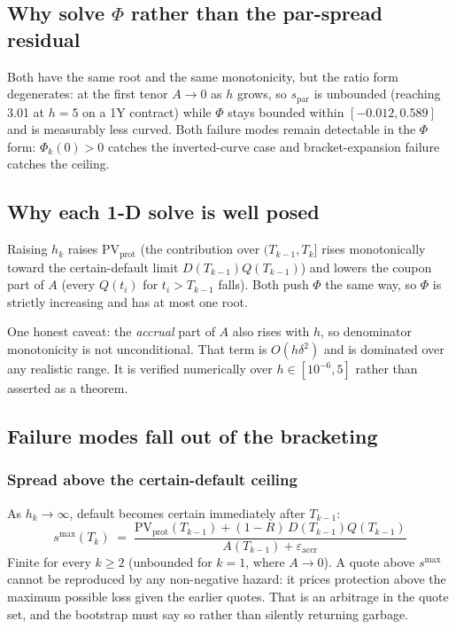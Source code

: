 \documentclass[11pt,a4paper]{article}
\begin{document}
\subsection{Why solve $\Phi$ rather than the par-spread residual}

Both have the same root and the same monotonicity, but the ratio form degenerates: at the
first tenor $A \to 0$ as $h$ grows, so $s_{\text{par}}$ is unbounded (reaching 3.01 at $h=5$
on a 1Y contract) while $\Phi$ stays bounded within $[-0.012, 0.589]$ and is measurably less
curved. Both failure modes remain detectable in the $\Phi$ form: $\Phi_k(0) > 0$ catches the
inverted-curve case and bracket-expansion failure catches the ceiling.

\subsection{Why each 1-D solve is well posed}

Raising $h_k$ raises $\text{PV}_{\text{prot}}$ (the contribution over $(T_{k-1},T_k]$ rises
monotonically toward the certain-default limit $D(T_{k-1})Q(T_{k-1})$) and lowers the coupon
part of $A$ (every $Q(t_i)$ for $t_i > T_{k-1}$ falls). Both push $\Phi$ the same way, so
$\Phi$ is strictly increasing and has at most one root.

One honest caveat: the \emph{accrual} part of $A$ also rises with $h$, so denominator
monotonicity is not unconditional. That term is $O(h\delta^2)$ and is dominated over any
realistic range. It is verified numerically over $h \in [10^{-6}, 5]$ rather than asserted as
a theorem.

\subsection{Failure modes fall out of the bracketing}

\subsubsection*{Spread above the certain-default ceiling}

As $h_k \to \infty$, default becomes certain immediately after $T_{k-1}$:
\[
s^{\max}(T_k) \;=\;
\frac{\text{PV}_{\text{prot}}(T_{k-1}) + (1-R)\,D(T_{k-1})Q(T_{k-1})}
     {A(T_{k-1}) + \varepsilon_{\text{accr}}}
\]
Finite for every $k \ge 2$ (unbounded for $k=1$, where $A \to 0$). A quote above $s^{\max}$
cannot be reproduced by any non-negative hazard: it prices protection above the maximum
possible loss given the earlier quotes. That is an arbitrage in the quote set, and the
bootstrap must say so rather than silently returning garbage.
\end{document}

